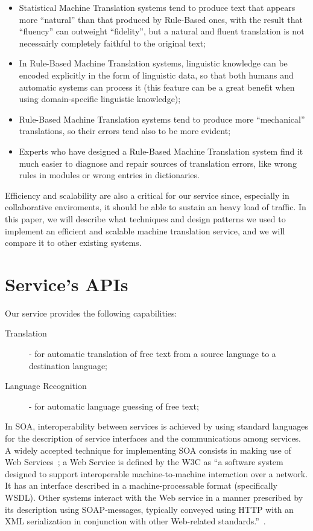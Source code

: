 \documentclass[11pt]{article}
\begin{document}
\begin{itemize}
 \item Statistical Machine Translation systems tend to produce text that appears more ``natural'' than that produced by Rule-Based ones, with the result that ``fluency'' can outweight ``fidelity'', but a natural and fluent translation is not necessairly completely faithful to the original text;
 \item In Rule-Based Machine Translation systems, linguistic knowledge can be encoded explicitly in the form of linguistic data, so that both humans and automatic systems can process it (this feature can be a great benefit when using domain-specific linguistic knowledge);
 \item Rule-Based Machine Translation systems tend to produce more ``mechanical'' translations, so their errors tend also to be more evident;
 \item Experts who have designed a Rule-Based Machine Translation system find it much easier to diagnose and repair sources of translation errors, like wrong rules in modules or wrong entries in dictionaries.
\end{itemize}

Efficiency and scalability are also a critical for our service since, especially in collaborative enviroments, it should be able to sustain an heavy load of traffic. In this paper, we will describe what techniques and design patterns we used to implement an efficient and scalable machine translation service, and we will compare it to other existing systems.


\section{Service's APIs}

Our service provides the following capabilities:

\begin{description}
  \item[Translation] - for automatic translation of free text from a source language to a destination language;
  \item[Language Recognition] - for automatic language guessing of free text;
\end{description}

In SOA, interoperability between services is achieved by using standard languages for the description of service interfaces and the communications among services. A widely accepted technique for implementing SOA consists in making use of Web Services~\citep{soa}; a Web Service is defined by the W3C as ``a software system designed to support interoperable machine-to-machine interaction over a network. It has an interface described in a machine-processable format (specifically WSDL). Other systems interact with the Web service in a manner prescribed by its description using SOAP-messages, typically conveyed using HTTP with an XML serialization in conjunction with other Web-related standards.''~\citep{wsgloss}. 
\end{document}
